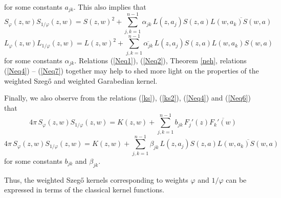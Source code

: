 \documentclass[11pt, reqno]{amsart}
\numberwithin{equation}{section}
\begin{document}
for some constants $a_{jk}$. This also implies that
\begin{equation}\label{Neq6}
	S_{\varphi}(z,w) S_{1/\varphi}(z,w) = S(z,w)^2 + \sum_{j,k=1}^{n-1} \alpha_{jk}\,L(z,a_j)S(z,a) \overline{L(w,a_k)S(w,a)}
\end{equation}
\begin{equation}\label{Neq7}
	L_{\varphi}(z,w) L_{1/\varphi}(z,w) = L(z,w)^2 + \sum_{j,k=1}^{n-1} \overline{\alpha_{jk}}\, L(z,a_j)S(z,a) L(w,a_k)S(w,a)
\end{equation}
for some constants $\alpha_{jk}$.
Relations (\ref{Neq1}), (\ref{Neq2}), Theorem \ref{neh}, relations (\ref{Neq4}) -- (\ref{Neq7}) together may help to shed more light on the properties of the weighted Szeg\H{o} and weighted Garabedian kernel.

\medskip

Finally, we also observe from the relations (\ref{ks}), (\ref{ks2}), (\ref{Neq4}) and (\ref{Neq6}) that
\begin{equation}
4\pi\,S_{\varphi}(z,w) S_{1/\varphi}(z,w) = K(z,w) + \sum_{j,k=1}^{n-1} b_{jk}\,F_{j}'(z)\overline{F_k'(w)}
\end{equation}
\begin{equation}
4\pi\, S_{\varphi}(z,w) S_{1/\varphi}(z,w) = K(z,w) + \sum_{j,k=1}^{n-1} \beta_{jk}\,L(z,a_j)S(z,a) \overline{L(w,a_k)S(w,a)}
\end{equation}
for some constants $b_{jk}$ and $\beta_{jk}$.

\medskip

Thus, the weighted Szeg\H{o} kernels corresponding to weights $\varphi$ and $1/\varphi$ can be expressed in terms of the classical kernel functions.
    
\end{document}
